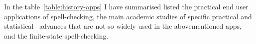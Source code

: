 \documentclass[officiallayout]{unihelcompling}
\begin{document}

In the table~\ref{table:history-apps} I have summarised listed the practical
end user applications of spell-checking, the main academic studies of specific
practical and statistical~\citep{al2006learning} advances that are not so widely
used in the abovementioned apps, and the finite-state spell-checking.
\end{document}
